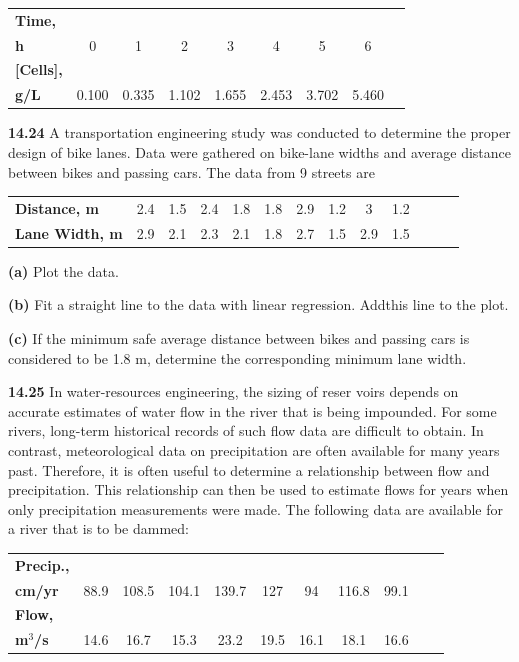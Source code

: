 \documentclass[../main.tex]{subfiles}
\begin{document}
\begin{multicols}{2}
	\noindent \begin{tabular}{l c c c c c c c c}
		\textbf{Time,} \\
		\textbf{h} &  0 &  1 &  2 &  3 &  4 &  5 &  6 \\
		\textbf{[Cells],} \\
		\textbf{g/L} & 0.100 & 0.335 & 1.102 & 1.655 & 2.453 & 3.702 & 5.460
	\end{tabular}

	\noindent\textbf{14.24} A transportation engineering study was conducted to
	determine the proper design of bike lanes. Data were gathered on bike-lane widths and average distance between bikes
	and passing cars. The data from 9 streets are

	\noindent \begin{tabular}{l c c c c c c c c c c c c}
		\textbf{Distance, m} & 2.4 & 1.5 & 2.4 & 1.8 & 1.8 & 2.9 & 1.2 & 3 & 1.2 \\
		\textbf{Lane Width, m} & 2.9 & 2.1 & 2.3 & 2.1 & 1.8 & 2.7 & 1.5 & 2.9 & 1.5
	\end{tabular}

	\noindent \textbf{(a)} Plot the data.

	\noindent \textbf{(b)} Fit a straight line to the data with linear regression. Addthis line to the plot.

	\noindent \textbf{(c)} If the minimum safe average distance between bikes and passing cars is considered to be 1.8 m, determine the corresponding minimum lane width.

	\noindent\textbf{14.25}  In water-resources engineering, the sizing of reser	voirs depends on accurate estimates of water flow in the
	river that is being impounded. For some rivers, long-term
	historical records of such flow data are difficult to obtain. In
	contrast, meteorological data on precipitation are often
	available for many years past. Therefore, it is often useful to determine a relationship between flow and precipitation.
	This relationship can then be used to estimate flows for
	years when only precipitation measurements were made.
	The following data are available for a river that is to be
	dammed:

	\noindent \begin{tabular}{l c c c c c c c c c c}
		\textbf{Precip.,} \\
		\textbf{cm/yr} & 88.9 & 108.5 & 104.1 & 139.7 & 127 & 94 & 116.8 & 99.1 \\
		\textbf{Flow,} \\
		\textbf{m$^3$/s} & 14.6 & 16.7 & 15.3 & 23.2 & 19.5 & 16.1 & 18.1 & 16.6
	\end{tabular}	


\end{multicols}
\end{document}
